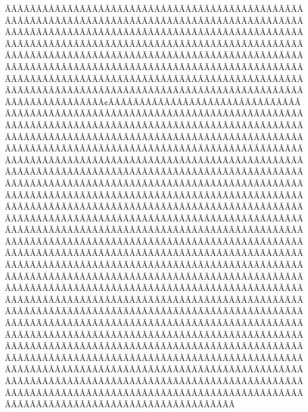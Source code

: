 ÃÂÃÂÃÂÃÂÃÂÃÂÃÂÃÂÃÂÃÂÃÂÃÂÃÂÃÂÃÂÃÂÃÂÃÂÃÂÃÂÃÂÃÂÃÂÃÂÃÂÃÂÃÂÃÂÃÂÃÂÃÂÃÂÃÂÃÂÃÂÃÂÃÂÃÂÃÂÃÂÃÂÃÂÃÂÃÂÃÂÃÂÃÂÃÂÃÂÃÂÃÂÃÂÃÂÃÂÃÂÃÂÃÂÃÂÃÂÃÂÃÂÃÂÃÂÃÂÃÂÃÂÃÂÃÂÃÂÃÂÃÂÃÂÃÂÃÂÃÂÃÂÃÂÃÂÃÂÃÂÃÂÃÂÃÂÃÂÃÂÃÂÃÂÃÂÃÂÃÂÃÂÃÂÃÂÃÂÃÂÃÂÃÂÃÂÃÂÃÂÃÂÃÂÃÂÃÂÃÂÃÂÃÂÃÂÃÂÃÂÃÂÃÂÃÂÃÂÃÂÃÂÃÂÃÂÃÂÃÂÃÂÃÂÃÂÃÂÃÂÃÂÃÂÃÂÃÂÃÂÃÂÃÂÃÂÃÂÃÂÃÂÃÂÃÂÃÂÃÂÃÂÃÂÃÂÃÂÃÂÃÂÃÂÃÂÃÂÃÂÃÂÃÂÃÂÃÂÃÂÃÂÃÂÃÂÃÂÃÂÃÂÃÂÃÂÃÂÃÂÃÂÃÂÃÂÃÂÃÂÃÂÃÂÃÂÃÂÃÂÃÂÃÂÃÂÃÂÃÂÃÂÃÂÃÂÃÂÃÂÃÂÃÂÃÂÃÂÃÂÃÂÃÂÃÂÃÂÃÂÃÂÃÂÃÂÃÂÃÂ¢ÃÂÃÂÃÂÃÂÃÂÃÂÃÂÃÂÃÂÃÂÃÂÃÂÃÂÃÂÃÂÃÂÃÂÃÂÃÂÃÂÃÂÃÂÃÂÃÂÃÂÃÂÃÂÃÂÃÂÃÂÃÂÃÂÃÂÃÂÃÂÃÂÃÂÃÂÃÂÃÂÃÂÃÂÃÂÃÂÃÂÃÂÃÂÃÂÃÂÃÂÃÂÃÂÃÂÃÂÃÂÃÂÃÂÃÂÃÂÃÂÃÂÃÂÃÂÃÂÃÂÃÂÃÂÃÂÃÂÃÂÃÂÃÂÃÂÃÂÃÂÃÂÃÂÃÂÃÂÃÂÃÂÃÂÃÂÃÂÃÂÃÂÃÂÃÂÃÂÃÂÃÂÃÂÃÂÃÂÃÂÃÂÃÂÃÂÃÂÃÂÃÂÃÂÃÂÃÂÃÂÃÂÃÂÃÂÃÂÃÂÃÂÃÂÃÂÃÂÃÂÃÂÃÂÃÂÃÂÃÂÃÂÃÂÃÂÃÂÃÂÃÂÃÂÃÂÃÂÃÂÃÂÃÂÃÂÃÂÃÂÃÂÃÂÃÂÃÂÃÂÃÂÃÂÃÂÃÂÃÂÃÂÃÂÃÂÃÂÃÂÃÂÃÂÃÂÃÂÃÂÃÂÃÂÃÂÃÂÃÂÃÂÃÂÃÂÃÂÃÂÃÂÃÂÃÂÃÂÃÂÃÂÃÂÃÂÃÂÃÂÃÂÃÂÃÂÃÂÃÂÃÂÃÂÃÂÃÂÃÂÃÂÃÂÃÂÃÂÃÂÃÂÃÂÃÂÃÂÃÂÃÂÃÂÃÂÃÂÃÂÃÂÃÂÃÂÃÂÃÂÃÂÃÂÃÂÃÂÃÂÃÂÃÂÃÂÃÂÃÂÃÂÃÂÃÂÃÂÃÂÃÂÃÂÃÂÃÂÃÂÃÂÃÂÃÂÃÂÃÂÃÂÃÂÃÂÃÂÃÂÃÂÃÂÃÂÃÂÃÂÃÂÃÂÃÂÃÂÃÂÃÂÃÂÃÂÃÂÃÂÃÂÃÂÃÂÃÂÃÂÃÂÃÂÃÂÃÂÃÂÃÂÃÂÃÂÃÂÃÂÃÂÃÂÃÂÃÂÃÂÃÂÃÂÃÂÃÂÃÂÃÂÃÂÃÂÃÂÃÂÃÂÃÂÃÂÃÂÃÂÃÂÃÂÃÂÃÂÃÂÃÂÃÂÃÂÃÂÃÂÃÂÃÂÃÂÃÂÃÂÃÂÃÂÃÂÃÂÃÂÃÂÃÂÃÂÃÂÃÂÃÂÃÂÃÂÃÂÃÂÃÂÃÂÃÂÃÂÃÂÃÂÃÂÃÂÃÂÃÂÃÂÃÂÃÂÃÂÃÂÃÂÃÂÃÂÃÂÃÂÃÂÃÂÃÂÃÂÃÂÃÂÃÂÃÂÃÂÃÂÃÂÃÂÃÂÃÂÃÂÃÂÃÂÃÂÃÂÃÂÃÂÃÂÃÂÃÂÃÂÃÂÃÂÃÂÃÂÃÂÃÂÃÂÃÂÃÂÃÂÃÂÃÂÃÂÃÂÃÂÃÂÃÂÃÂÃÂÃÂÃÂÃÂÃÂÃÂÃÂÃÂÃÂÃÂÃÂÃÂÃÂÃÂÃÂÃÂÃÂÃÂÃÂÃÂÃÂÃÂÃÂÃÂÃÂÃÂÃÂÃÂÃÂÃÂÃÂÃÂÃÂÃÂÃÂÃÂÃÂÃÂÃÂÃÂÃÂÃÂÃÂÃÂÃÂÃÂÃÂÃÂÃÂÃÂÃÂÃÂÃÂÃÂÃÂÃÂÃÂÃÂÃÂÃÂÃÂÃÂÃÂÃÂÃÂÃÂÃÂÃÂÃÂÃÂÃÂÃÂÃÂÃÂÃÂÃÂÃÂÃÂÃÂÃÂÃÂÃÂÃÂÃÂÃÂÃÂÃÂÃÂÃÂÃÂÃÂÃÂÃÂÃÂÃÂÃÂÃÂÃÂÃÂÃÂÃÂÃÂÃÂÃÂÃÂÃÂÃÂÃÂÃÂÃÂÃÂÃÂÃÂÃÂÃÂÃÂÃÂÃÂÃÂÃÂÃÂÃÂÃÂÃÂÃÂÃÂÃÂÃÂÃÂÃÂÃÂÃÂÃÂÃÂÃÂÃÂÃÂÃÂÃÂÃÂÃÂÃÂÃÂÃÂÃÂÃÂÃÂÃÂÃÂÃÂÃÂÃÂÃÂÃÂÃÂÃÂÃÂÃÂÃÂÃÂÃÂÃÂÃÂÃÂÃÂÃÂÃÂÃÂÃÂÃÂÃÂÃÂÃÂÃÂÃÂÃÂÃÂÃÂÃÂÃÂÃÂÃÂÃÂÃÂÃÂÃÂÃÂÃÂÃÂÃÂÃÂÃÂÃÂÃÂÃÂÃÂÃÂÃÂÃÂÃÂÃÂÃÂÃÂÃÂÃÂÃÂÃÂÃÂÃÂÃÂÃÂÃÂÃÂÃÂÃÂÃÂÃÂÃÂÃÂÃÂÃÂÃÂÃÂÃÂÃÂÃÂÃÂÃÂÃÂÃÂÃÂÃÂÃÂÃÂÃÂÃÂÃÂÃÂÃÂÃÂÃÂÃÂÃÂÃÂÃÂÃÂÃÂÃÂÃÂÃÂÃÂÃÂÃÂÃÂÃÂÃÂ